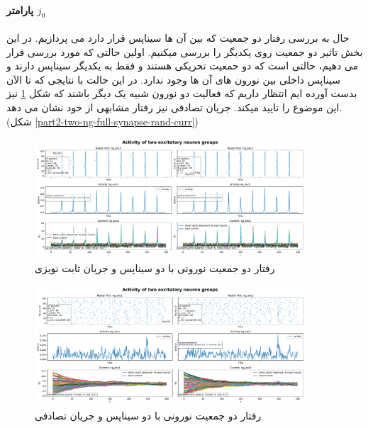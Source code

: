 \documentclass{report}
\begin{document}
            \paragraph*{پارامتر $j_0$}
            حال به بررسی رفتار دو جمعیت که بین آن ها سیناپس قرار دارد می پردازیم. در این بخش   تاثیر دو جمعیت روی یکدیگر را بررسی میکنیم. اولین حالتی که مورد بررسی قرار می دهیم، حالتی است که دو حمعیت تحریکی هستند و فقط به یکدیگر سیناپس دارند و سیناپس داخلی بین نورون های آن ها وجود ندارد.
            در این حالت با نتایجی که تا الآن بدست آورده ایم انتظار داریم که فعالیت دو نورون شبیه یک دیگر باشند که شکل
            \ref{fig:part2-two-ng-full-synapse-noise-curr}
            نیز این موضوع را تایید میکند. جریان تصادفی نیز رفتار مشابهی از خود نشان می دهد. 
            (شکل \ref{part2-two-ng-full-synapse-rand-curr})
            \begin{figure}[!ht]
                \centering
                \includegraphics[width=0.9\textwidth]{plots/part2-two-ng-full-synapse-noise-curr.pdf} 
                \caption{رفتار دو جمعیت نورونی با دو سیناپس و جریان ثابت نویزی}
                \label{fig:part2-two-ng-full-synapse-noise-curr}
            \end{figure}
            \begin{figure}[!ht]
                \centering
                \includegraphics[width=0.9\textwidth]{plots/part2-two-ng-full-synapse-rand-curr.pdf} 
                \caption{رفتار دو جمعیت نورونی با دو سیناپس و جریان تصادفی}
                \label{fig:part2-two-ng-full-synapse-rand-curr}
            \end{figure}
\end{document}
